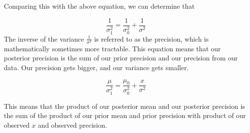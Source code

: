 \documentclass[12pt]{article}
\begin{document}
Comparing this with the above equation, we can determine that

\[
\frac{1}{\sigma_1^2} = \frac{1}{\sigma_0^2} + \frac{1}{\sigma^2}
\]
The inverse of the variance $\frac{1}{\sigma^2}$ is referred to as the precision, which is mathematically sometimes more tractable. This equation means that our posterior precision is the sum of our prior precision and our precision from our data. Our precision gets bigger, and our variance gets smaller.

\[
\frac{\mu}{\sigma_1^2} = \frac{\mu_0}{\sigma_0^2} + \frac{x}{\sigma^2}
\]

This means that the product of our posterior mean and our posterior precision is the sum of the product of our prior mean and prior precision with product of our observed $x$ and observed precision.
\end{document}
